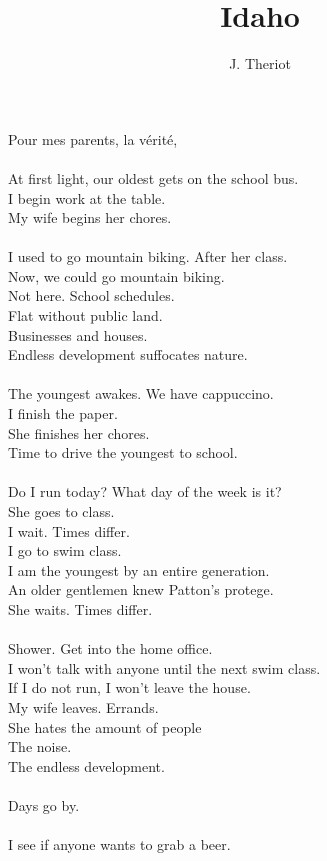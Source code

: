 \documentclass[submission]{sffms}
\author{J. Theriot}
\title{Idaho}
\begin{document}
\newpage
Pour mes parents, la vérité,
\ \\
\ \\
At first light, our oldest gets on the school bus. 
\ \\
I begin work at the table. 
\ \\
My wife begins her chores.
\ \\
\ \\
I used to go mountain biking. After her class.
\ \\
Now, we could go mountain biking.
\ \\
Not here. School schedules.
\ \\
Flat without public land.
\ \\
Businesses and houses.
\ \\
Endless development suffocates nature.
\ \\
\ \\
The youngest awakes. We have cappuccino.
\ \\
I finish the paper.
\ \\
She finishes her chores.
\ \\
Time to drive the youngest to school. 
\ \\
\ \\
Do I run today? What day of the week is it? 
\ \\
She goes to class. 
\ \\
I wait. Times differ.
\ \\
I go to swim class. 
\ \\
I am the youngest by an entire generation. 
\ \\
An older gentlemen knew Patton's protege. 
\ \\
She waits. Times differ.
\ \\
\ \\
Shower. Get into the home office.
\ \\
I won't talk with anyone until the next swim class.
\ \\
If I do not run, I won't leave the house.
\ \\
My wife leaves. Errands.
\ \\
She hates the amount of people
\ \\
The noise. 
\ \\
The endless development.
\ \\
\ \\
Days go by. 
\ \\
\ \\
I see if anyone wants to grab a beer. 
\ \\
\end{document}
